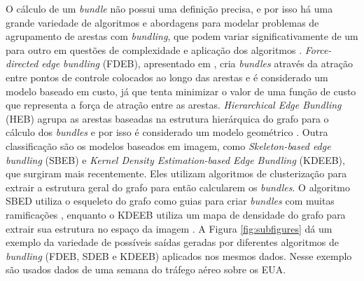   O cálculo de um \emph{bundle} não possui uma definição precisa, e por isso há
uma grande variedade de algoritmos e abordagens para modelar problemas de
agrupamento de arestas com \emph{bundling}, que podem variar significativamente
de um para outro em questões de complexidade e aplicação dos algoritmos
\citep{Zhou2013}.  \emph{Force-directed edge bundling} (FDEB), apresentado em
\citet{Holten2009}, cria \emph{bundles} através da atração entre pontos de
controle colocados ao longo das arestas e é considerado um modelo baseado em
custo, já que tenta minimizar o valor de uma função de custo que representa a
força de atração entre as arestas.  \emph{Hierarchical Edge Bundling} (HEB)
agrupa as arestas baseadas na estrutura hierárquica do grafo para o cálculo dos
\emph{bundles} e por isso é considerado um modelo geométrico \citep{Holten2006}. Outra
classificação são os modelos baseados em imagem, como \emph{Skeleton-based edge
bundling} (SBEB) e \emph{Kernel Density Estimation-based Edge Bundling}
(KDEEB), que surgiram mais recentemente. Eles utilizam algoritmos de
clusterização para extrair a estrutura geral do grafo para então calcularem os
\emph{bundles}. O algoritmo SBED utiliza o esqueleto do grafo como guias para
criar \emph{bundles} com muitas ramificações \citep{Ersoy2011}, enquanto o
KDEEB utiliza um mapa de densidade do grafo para extrair sua estrutura no
espaço da imagem \citep{Hurter2012}. A Figura \ref{fig:subfigures} dá um
exemplo da variedade de possíveis saídas geradas por diferentes algoritmos de
\emph{bundling} (FDEB, SDEB e KDEEB) aplicados nos mesmos dados.  Nesse exemplo
são usados dados de uma semana do tráfego aéreo sobre os EUA.

